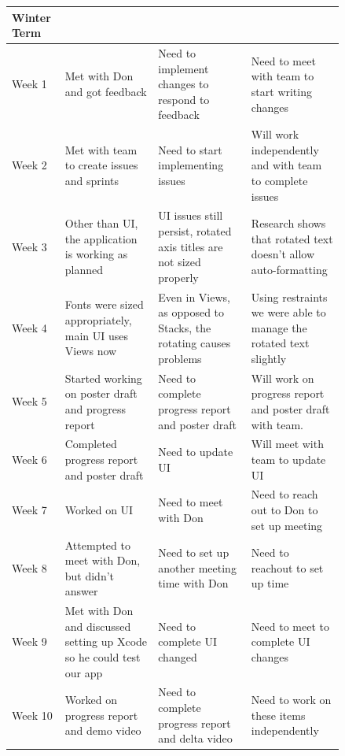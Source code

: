 \documentclass[onecolumn, draftclsnofoot,10pt, compsoc]{IEEEtran}
\begin{document}
\begin{center}
\begin{longtable}{| l | p{0.28\linewidth} | p{0.28\linewidth} | p{0.28\linewidth} |}
    Winter Term \\ \hline
    Week 1 & Met with Don and got feedback & Need to implement changes to respond to feedback & Need to meet with team to start writing changes \\ \hline
	Week 2 & Met with team to create issues and sprints & Need to start implementing issues & Will work independently and with team to complete issues \\ \hline
	Week 3 & Other than UI, the application is working as planned & UI issues still persist, rotated axis titles are not sized properly & Research shows that rotated text doesn't allow auto-formatting \\ \hline
	Week 4 & Fonts were sized appropriately, main UI uses Views now & Even in Views, as opposed to Stacks, the rotating causes problems & Using restraints we were able to manage the rotated text slightly \\ \hline
    Week 5 & Started working on poster draft and progress report & Need to complete progress report and poster draft & Will work on progress report and poster draft with team. \\ \hline
    Week 6 & Completed progress report and poster draft & Need to update UI & Will meet with team to update UI \\ \hline
    Week 7 & Worked on UI & Need to meet with Don & Need to reach out to Don to set up meeting \\ \hline
    Week 8 & Attempted to meet with Don, but didn't answer & Need to set up another meeting time with Don & Need to reachout to set up time \\ \hline
    Week 9 & Met with Don and discussed setting up Xcode so he could test our app & Need to complete UI changed & Need to meet to complete UI changes \\ \hline
    Week 10 & Worked on progress report and demo video & Need to complete progress report and delta video & Need to work on these items independently \\ \hline

\end{longtable}
\end{center}

\newpage


\end{document}
